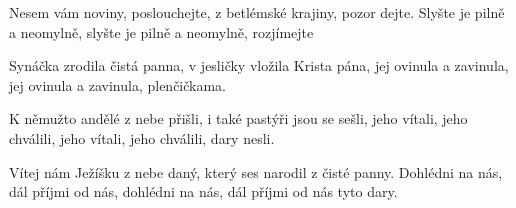 \vskip-5mm
\IncludeLilypond

Nesem vám noviny, poslouchejte,
z betlémské krajiny, pozor dejte.
Slyšte je pilně a neomylně,
slyšte je pilně a neomylně, rozjímejte

Synáčka zrodila čistá panna,
v jesličky vložila Krista pána,
jej ovinula a zavinula,
jej ovinula a zavinula, plenčičkama.

K němužto andělé z nebe přišli,
i také pastýři jsou se sešli,
jeho vítali, jeho chválili,
jeho vítali, jeho chválili, dary nesli.

Vítej nám Ježíšku z nebe daný,
který ses narodil z čisté panny.
Dohlédni na nás, dál příjmi od nás,
dohlédni na nás, dál příjmi od nás tyto dary.
